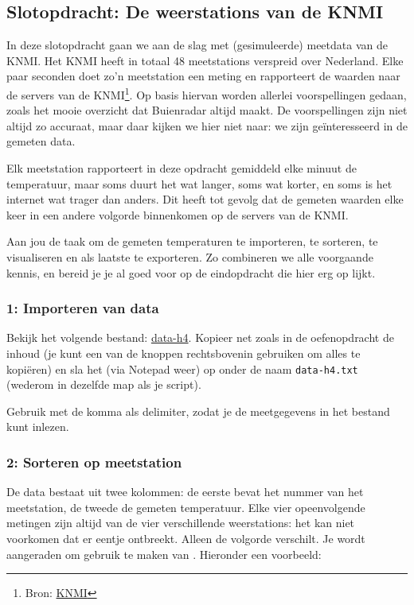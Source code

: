 \documentclass[a4paper,11pt, fleqn]{article}
\begin{document}
\subsection{Slotopdracht: De weerstations van de KNMI}
In deze slotopdracht gaan we aan de slag met (gesimuleerde) meetdata van de KNMI. Het KNMI heeft in totaal 48 meetstations verspreid over Nederland. Elke paar seconden doet zo'n meetstation een meting en rapporteert de waarden naar de servers van de KNMI\footnote{Bron: \href{https://www.knmi.nl/kennis-en-datacentrum/uitleg/automatische-weerstations}{KNMI}}. Op basis hiervan worden allerlei voorspellingen gedaan, zoals het mooie overzicht dat Buienradar altijd maakt. De voorspellingen zijn niet altijd zo accuraat, maar daar kijken we hier niet naar: we zijn ge\"interesseerd in de gemeten data.

Elk meetstation rapporteert in deze opdracht gemiddeld elke minuut de temperatuur, maar soms duurt het wat langer, soms wat korter, en soms is het internet wat trager dan anders. Dit heeft tot gevolg dat de gemeten waarden elke keer in een andere volgorde binnenkomen op de servers van de KNMI.

Aan jou de taak om de gemeten temperaturen te importeren, te sorteren, te visualiseren en als laatste te exporteren. Zo combineren we alle voorgaande kennis, en bereid je je al goed voor op de eindopdracht die hier erg op lijkt.

\subsubsection*{1: Importeren van data}
Bekijk het volgende bestand:
\href{https://github.com/Ichthus-College-IN/Python-x-Meet-je-leefomgeving/tree/main/inc/data_h4.txt}{data-h4}. Kopieer net zoals in de oefenopdracht de inhoud (je kunt een van de knoppen rechtsbovenin gebruiken om alles te kopi\"eren) en sla het (via Notepad weer) op onder de naam \verb,data-h4.txt, (wederom in dezelfde map als je script).

Gebruik  met de komma als delimiter, zodat je de meetgegevens in het bestand kunt inlezen.

\subsubsection*{2: Sorteren op meetstation}
De data bestaat uit twee kolommen: de eerste bevat het nummer van het meetstation, de tweede de gemeten temperatuur. Elke vier opeenvolgende metingen zijn altijd van de vier verschillende weerstations: het kan niet voorkomen dat er eentje ontbreekt. Alleen de volgorde verschilt. Je wordt aangeraden om gebruik te maken van . Hieronder een voorbeeld:
\end{document}

